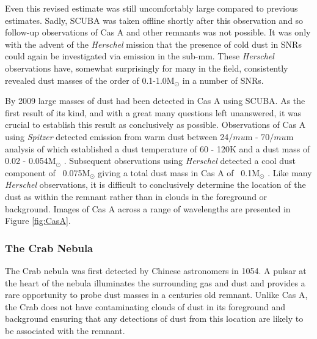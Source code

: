 Even this revised estimate was still uncomfortably large compared to previous estimates.  Sadly, SCUBA was taken offline shortly after this observation and so follow-up observations of Cas A and other remnants was not possible.  It was only with the advent of the \textit{Herschel} mission that the presence of cold dust in SNRs could again be investigated via emission in the sub-mm.  These \textit{Herschel} observations have, somewhat surprisingly for many in the field, consistently revealed dust masses of the order of 0.1-1.0M$_{\odot}$ in a number of SNRs.


By 2009 large masses of dust had been detected in Cas A using SCUBA.  As the first result of its kind, and with a great many questions left unanswered, it was crucial to establish this result as conclusively as possible.   Observations of Cas A using \textit{Spitzer} detected emission from warm dust between 24$/mu$m - 70$/mu$m analysis of which established a dust temperature of 60 - 120K and a dust mass of 0.02 - 0.054M$_{\odot}$ \citep{Rho2008}.  Subsequent observations using \textit{Herschel} detected a cool dust component of ~0.075M$_{\odot}$ giving a total dust mass in Cas A of ~0.1M$_{\odot}$ \citep{Barlow2010}.  Like many {\em Herschel} observations, it is difficult to conclusively determine the location of the dust as within the remnant rather than in clouds in the foreground or background.  Images of Cas A across a range of wavelengths are presented in Figure \ref{fig:CasA}.  

\subsubsection{The Crab Nebula}

The Crab nebula was first detected by Chinese astronomers in 1054.  A pulsar at the heart of the nebula illuminates the surrounding gas and dust and provides a rare opportunity to probe dust masses in a centuries old remnant.  Unlike Cas A, the Crab does not have contaminating clouds of dust in its foreground and background ensuring that any detections of dust from this location are likely to be associated with the remnant.
 
